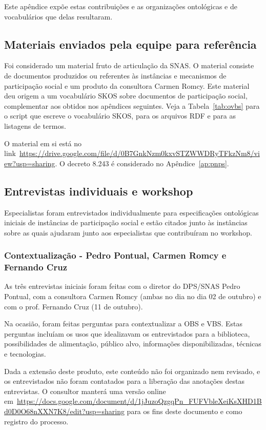 \documentclass[12pt]{article}
\begin{document}
Este apêndice expõe estas contribuições e as organizações ontológicas e de vocabulários que delas resultaram.

\subsection{Materiais enviados pela equipe para referência}
Foi considerado um material fruto de articulação da SNAS. O material consiste de documentos produzidos ou referentes às instâncias e mecanismos de participação social e um produto da consultora Carmen Romcy. Este material deu origem a um vocabulário SKOS sobre documentos de participação social, complementar aos obtidos nos apêndices seguintes. 
Veja a Tabela~\ref{tab:ovbs} para o script que escreve o vocabulário SKOS, para os arquivos RDF e para as listagens de termos.

O material em si está no link~\url{https://drive.google.com/file/d/0B7GnkNzm0kxvSTZWWDRyTFkzNm8/view?usp=sharing}.
 O decreto 8.243 é considerado no Apêndice~\ref{ap:pnps}.

\subsection{Entrevistas individuais e workshop}
Especialistas foram entrevistados individualmente para especificações ontológicas iniciais de instâncias de participação social e estão citados junto às instâncias sobre as quais ajudaram junto aos especialistas que contribuíram no workshop.

\subsubsection{Contextualização - Pedro Pontual, Carmen Romcy e Fernando Cruz}
As três entrevistas iniciais foram feitas com o diretor do DPS/SNAS Pedro Pontual, com a consultora Carmen Romcy (ambas no dia no dia 02 de outubro) e com o prof. Fernando Cruz (11 de outubro).

Na ocasião, foram feitas perguntas para contextualizar a OBS e VBS. Estas perguntas incluíam os usos que idealizavam os entrevistados para a biblioteca, possibilidades de alimentação, público alvo, informações disponibilizadas, técnicas e tecnologias.

Dada a extensão deste produto, este conteúdo não foi organizado nem revisado, e os entrevistados não foram contatados para a liberação das anotações destas entrevistas. O consultor manterá uma versão online em~\url{https://docs.google.com/document/d/1jJuzoQzgqPn_FUFVbleXeiKsXHD1Bd0D0O68nXXN7K8/edit?usp=sharing} para os fins deste documento e como registro do processo.
\end{document}
